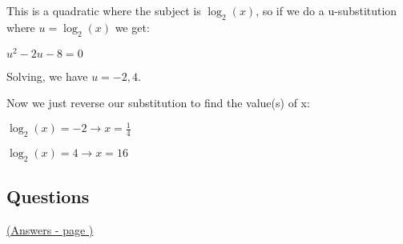 \documentclass[../main.tex]{subfiles}
\begin{document}
This is a quadratic where the subject is $\log_2(x)$, so if we do a u-substitution where $u=\log_2(x)$ we get:

\(u^2-2u-8=0\)

Solving, we have $u=-2, 4$.

Now we just reverse our substitution to find the value(s) of x:

\(\log_2(x)=-2 \rightarrow x=\frac{1}{4}\)

\(\log_2(x)=4 \rightarrow x=16\)


\pagebreak
\hypertarget{logproblemslink}{\subsection*{Questions}}
\hyperlink{logproblemsanswers}{(Answers - page {\pageref*{Log problems answers}})}

\label{Log problems}
\end{document}
